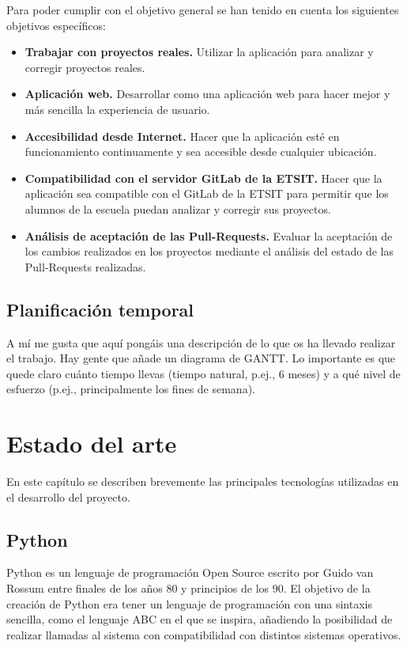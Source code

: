\documentclass[a4paper, 12pt]{book}
\begin{document}
Para poder cumplir con el objetivo general se han tenido en cuenta los siguientes objetivos específicos:

\begin{itemize}
	\item \textbf{Trabajar con proyectos reales.} Utilizar la aplicación para analizar y corregir proyectos reales.
	\item \textbf{Aplicación web.} Desarrollar como una aplicación web para hacer mejor y más sencilla la experiencia de usuario.
	\item \textbf{Accesibilidad desde Internet.} Hacer que la aplicación esté en funcionamiento continuamente y sea accesible desde cualquier ubicación.
	\item \textbf{Compatibilidad con el servidor GitLab de la ETSIT.} Hacer que la aplicación sea compatible con el GitLab de la ETSIT para permitir que los alumnos de la escuela puedan analizar y corregir sus proyectos.
	\item \textbf{Análisis de aceptación de las Pull-Requests.} Evaluar la aceptación de los cambios realizados en los proyectos mediante el análisis del estado de las Pull-Requests realizadas.
\end{itemize}


\section{Planificación temporal}
\label{sec:planificacion-temporal}
A mí me gusta que aquí pongáis una descripción de lo que os ha llevado realizar el trabajo.
Hay gente que añade un diagrama de GANTT.
Lo importante es que quede claro cuánto tiempo llevas (tiempo natural, p.ej., 6 meses) y a qué nivel de esfuerzo (p.ej., principalmente los fines de semana).



\cleardoublepage
\chapter{Estado del arte}
\label{chap:estado}

En este capítulo se describen brevemente las principales tecnologías utilizadas en el desarrollo del proyecto.

\section{Python} 
\label{sec:python}
Python \cite{python} es un lenguaje de programación Open Source escrito por Guido van Rossum entre finales de los años 80 y principios de los 90. El objetivo de la creación de Python era tener un lenguaje de programación con una sintaxis sencilla, como el lenguaje ABC en el que se inspira, añadiendo la posibilidad de realizar llamadas al sistema con compatibilidad con distintos sistemas operativos.
\end{document}
